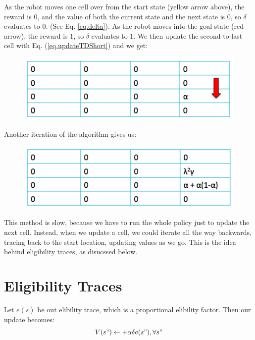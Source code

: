 \documentclass[11pt]{article}
\numberwithin{equation}{section}
\numberwithin{figure}{section}
\begin{document}
As the robot moves one cell over from the start state (yellow arrow above), the reward is $0$, and the value of both the current state and the next state is $0$, so $\delta$ evaluates to $0$.  (See Eq. \ref{eq.delta}).  As the robot moves into the goal state (red arrow), the reward is $1$, so $\delta$ evaluates to $1$.  We then update the second-to-last cell with Eq. (\ref{eq.updateTDShort}) and we get:

\begin{figure}[h!]
	\centering
	\includegraphics[width=.4\columnwidth]{./images/fig3}
	\label{fig.fig3}
\end{figure}

Another iteration of the algorithm gives us:

\begin{figure}[h!]
	\centering
	\includegraphics[width=.4\columnwidth]{./images/fig4}
	\label{fig.fig4}
\end{figure}

This method is slow, because we have to run the whole policy just to update the next cell.  Instead, when we update a cell, we could iterate all the way backwards, tracing back to the start location, updating values as we go.  This is the idea behind eligibility traces, as disucssed below.

\section{Eligibility Traces}
Let $e(s)$ be out elibility trace, which is a proportional elibility factor.
Then our update becomes:
\begin{equation}
	V(s") \leftarrow + \alpha \delta e(s"), \forall s"
\end{equation}

\end{document}
